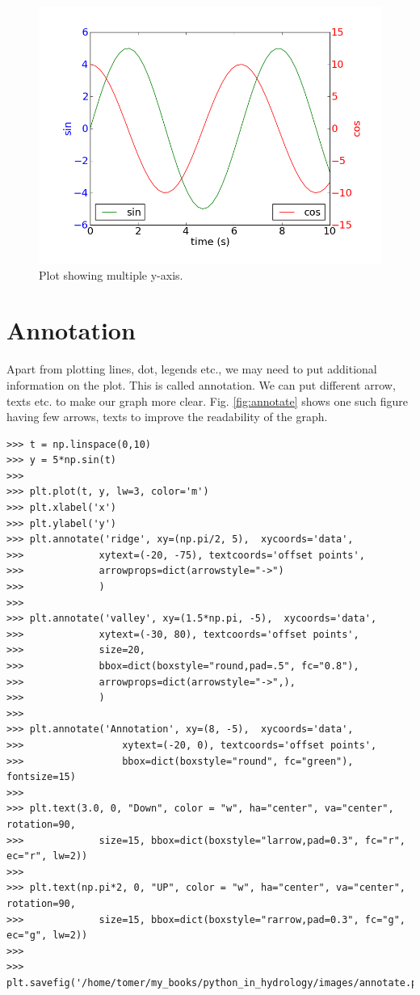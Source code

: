 \documentclass[10pt]{book}
\begin{document}
\beforefig
\begin{figure}[h!]
  \centering
    \includegraphics[scale=0.5]{images/multiple_y.png}
  \caption{Plot showing multiple y-axis.}
   \label{fig:multi_y}
\end{figure}
\afterfig

\section{Annotation}
Apart from plotting lines, dot, legends etc., we may need to put additional information on the plot. This is called annotation. We can put different arrow, texts etc. to make our graph more clear. Fig. \ref{fig:annotate} shows one such figure having few arrows, texts to improve the readability of the graph. 
\beforeverb \begin{verbatim}
>>> t = np.linspace(0,10)
>>> y = 5*np.sin(t)
>>> 
>>> plt.plot(t, y, lw=3, color='m')
>>> plt.xlabel('x')
>>> plt.ylabel('y')
>>> plt.annotate('ridge', xy=(np.pi/2, 5),  xycoords='data',
>>>             xytext=(-20, -75), textcoords='offset points',
>>>             arrowprops=dict(arrowstyle="->")
>>>             )
>>> 
>>> plt.annotate('valley', xy=(1.5*np.pi, -5),  xycoords='data',
>>>             xytext=(-30, 80), textcoords='offset points',
>>>             size=20,
>>>             bbox=dict(boxstyle="round,pad=.5", fc="0.8"),
>>>             arrowprops=dict(arrowstyle="->",),
>>>             )
>>> 
>>> plt.annotate('Annotation', xy=(8, -5),  xycoords='data',
>>>                 xytext=(-20, 0), textcoords='offset points',
>>>                 bbox=dict(boxstyle="round", fc="green"), fontsize=15)
>>> 
>>> plt.text(3.0, 0, "Down", color = "w", ha="center", va="center", rotation=90,
>>>             size=15, bbox=dict(boxstyle="larrow,pad=0.3", fc="r", ec="r", lw=2))
>>> 
>>> plt.text(np.pi*2, 0, "UP", color = "w", ha="center", va="center", rotation=90,
>>>             size=15, bbox=dict(boxstyle="rarrow,pad=0.3", fc="g", ec="g", lw=2))
>>> 
>>> plt.savefig('/home/tomer/my_books/python_in_hydrology/images/annotate.png')
\end{verbatim} \afterverb
\end{document}
